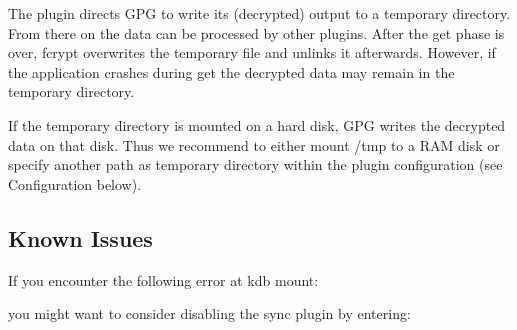 The plugin directs G\+PG to write its (decrypted) output to a temporary directory. From there on the data can be processed by other plugins. After the {\ttfamily get} phase is over, {\ttfamily fcrypt} overwrites the temporary file and unlinks it afterwards. However, if the application crashes during {\ttfamily get} the decrypted data may remain in the temporary directory.

If the temporary directory is mounted on a hard disk, G\+PG writes the decrypted data on that disk. Thus we recommend to either mount {\ttfamily /tmp} to a R\+AM disk or specify another path as temporary directory within the plugin configuration (see Configuration below).\hypertarget{autotoc_md207_autotoc_md210}{}\subsection{Known Issues}\label{autotoc_md207_autotoc_md210}
If you encounter the following error at {\ttfamily kdb mount}\+:


\begin{DoxyCode}{0}
\DoxyCodeLine{}
\end{DoxyCode}


you might want to consider disabling the sync plugin by entering\+:


\begin{DoxyCode}{0}
\end{DoxyCode}


